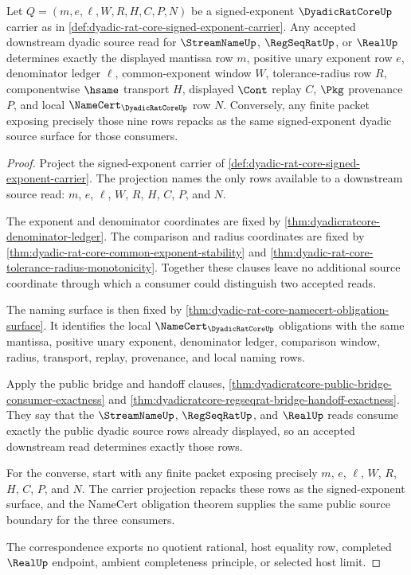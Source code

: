 \begin{theorem}
\label{thm:dyadic-rat-core-signed-exponent-source-determinacy}
Let $Q=(m,e,\ell,W,R,H,C,P,N)$ be a signed-exponent $\DyadicRatCoreUp$ carrier as in \autoref{def:dyadic-rat-core-signed-exponent-carrier}. Any accepted downstream dyadic source read for $\StreamNameUp$, $\RegSeqRatUp$, or $\RealUp$ determines exactly the displayed mantissa row $m$, positive unary exponent row $e$, denominator ledger $\ell$, common-exponent window $W$, tolerance-radius row $R$, componentwise $\hsame$ transport $H$, displayed $\Cont$ replay $C$, $\Pkg$ provenance $P$, and local $\NameCert_{\DyadicRatCoreUp}$ row $N$. Conversely, any finite packet exposing precisely those nine rows repacks as the same signed-exponent dyadic source surface for those consumers.
\end{theorem}
\begin{proof}
Project the signed-exponent carrier of \autoref{def:dyadic-rat-core-signed-exponent-carrier}. The projection names the only rows available to a downstream source read: $m$, $e$, $\ell$, $W$, $R$, $H$, $C$, $P$, and $N$.

The exponent and denominator coordinates are fixed by \autoref{thm:dyadicratcore-denominator-ledger}. The comparison and radius coordinates are fixed by \autoref{thm:dyadic-rat-core-common-exponent-stability} and \autoref{thm:dyadic-rat-core-tolerance-radius-monotonicity}. Together these clauses leave no additional source coordinate through which a consumer could distinguish two accepted reads.

The naming surface is then fixed by \autoref{thm:dyadic-rat-core-namecert-obligation-surface}. It identifies the local $\NameCert_{\DyadicRatCoreUp}$ obligations with the same mantissa, positive unary exponent, denominator ledger, comparison window, radius, transport, replay, provenance, and local naming rows.

Apply the public bridge and handoff clauses, \autoref{thm:dyadicratcore-public-bridge-consumer-exactness} and \autoref{thm:dyadicratcore-regseqrat-bridge-handoff-exactness}. They say that the $\StreamNameUp$, $\RegSeqRatUp$, and $\RealUp$ reads consume exactly the public dyadic source rows already displayed, so an accepted downstream read determines exactly those rows.

For the converse, start with any finite packet exposing precisely $m$, $e$, $\ell$, $W$, $R$, $H$, $C$, $P$, and $N$. The carrier projection repacks these rows as the signed-exponent surface, and the NameCert obligation theorem supplies the same public source boundary for the three consumers.

The correspondence exports no quotient rational, host equality row, completed $\RealUp$ endpoint, ambient completeness principle, or selected host limit.
\end{proof}

